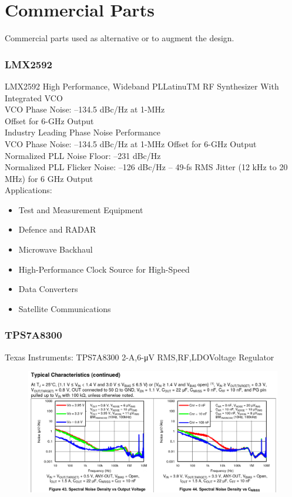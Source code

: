 \documentclass{article}
\begin{document}
\section{Commercial Parts}

Commercial parts used as alternative or to augment the design.

\subsubsection*{LMX2592}
LMX2592 High Performance, Wideband PLLatinuTM RF Synthesizer With Integrated VCO
\\
VCO Phase Noise: –134.5 dBc/Hz at 1-MHz
\\
Offset for 6-GHz Output
\\
Industry Leading Phase Noise Performance 
\\
VCO Phase Noise: –134.5 dBc/Hz at 1-MHz Offset for 6-GHz Output
\\
Normalized PLL Noise Floor: –231 dBc/Hz 
\\
Normalized PLL Flicker Noise: –126 dBc/Hz – 49-\unit[]{\fs} RMS Jitter (12 kHz to 20 MHz) for 6 GHz Output
\\
Applications: 
\begin{itemize}
	\item Test and Measurement Equipment
	\item Defence and RADAR
	\item Microwave Backhaul
	\item High-Performance Clock Source for High-Speed
	\item Data Converters
	\item Satellite Communications
\end{itemize}


\subsubsection*{TPS7A8300}

Texas Instruments: TPS7A8300 2-A,6-\unit{\micro\volt} RMS,RF,LDOVoltage Regulator

\begin{figure}[ht!]
	\includegraphics[width=0.5\linewidth]{Figures/LDO-noise-characteristic.png}
	\label{fig:ldo-noise-documntation}
\end{figure}
\end{document}
